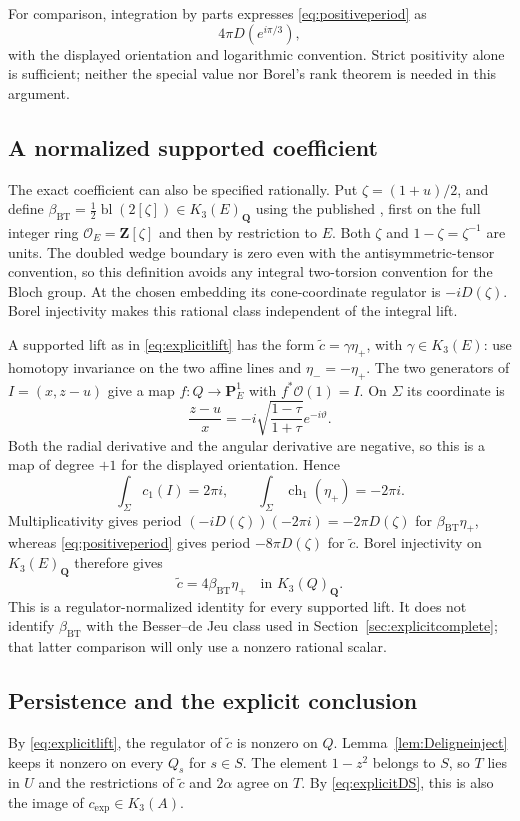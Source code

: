 \documentclass[11pt,a4paper]{article}
\theoremstyle{remark}
\newcommand{\Q}{\mathbf Q}
\newcommand{\Z}{\mathbf Z}
\newcommand{\OO}{\mathcal O}
\begin{document}
For comparison, integration by parts expresses \eqref{eq:positiveperiod} as
\[
4\pi D(e^{i\pi/3}),
\]
with the displayed orientation and logarithmic convention. Strict positivity alone is sufficient; neither the special value nor Borel's rank theorem is needed in this argument.

\subsection{A normalized supported coefficient}\label{sec:exactcoefficient}
The exact coefficient can also be specified rationally. Put $\zeta=(1+u)/2$, and define $\beta_{\mathrm{BT}}=\tfrac12\operatorname{bl}(2[\zeta])\in K_3(E)_{\Q}$ using the published \cite[Theorem~4.9 and (4.8)]{BunkeTamme}, first on the full integer ring $\OO_E=\Z[\zeta]$ and then by restriction to $E$. Both $\zeta$ and $1-\zeta=\zeta^{-1}$ are units. The doubled wedge boundary is zero even with the antisymmetric-tensor convention, so this definition avoids any integral two-torsion convention for the Bloch group. At the chosen embedding its cone-coordinate regulator is $-iD(\zeta)$. Borel injectivity makes this rational class independent of the integral lift.

A supported lift as in \eqref{eq:explicitlift} has the form $\widetilde c=\gamma\eta_+$, with $\gamma\in K_3(E)$: use homotopy invariance on the two affine lines and $\eta_-=-\eta_+$. The two generators of $I=(x,z-u)$ give a map $f:Q\to\mathbf P^1_E$ with $f^*\OO(1)=I$. On $\Sigma$ its coordinate is
\[
\frac{z-u}{x}=-i\sqrt{\frac{1-\tau}{1+\tau}}e^{-i\vartheta}.
\]
Both the radial derivative and the angular derivative are negative, so this is a map of degree $+1$ for the displayed orientation. Hence
\[
\int_\Sigma c_1(I)=2\pi i,\qquad
\int_\Sigma\operatorname{ch}_1(\eta_+)=-2\pi i.
\]
Multiplicativity gives period $(-iD(\zeta))(-2\pi i)=-2\pi D(\zeta)$ for $\beta_{\mathrm{BT}}\eta_+$, whereas \eqref{eq:positiveperiod} gives period $-8\pi D(\zeta)$ for $\widetilde c$. Borel injectivity on $K_3(E)_{\Q}$ therefore gives
\begin{equation}\label{eq:exactcoefficient}
\widetilde c=4\beta_{\mathrm{BT}}\eta_+
\quad\text{in }K_3(Q)_{\Q}.
\end{equation}
This is a regulator-normalized identity for every supported lift. It does not identify $\beta_{\mathrm{BT}}$ with the Besser--de Jeu class used in Section~\ref{sec:explicitcomplete}; that latter comparison will only use a nonzero rational scalar.

\subsection{Persistence and the explicit conclusion}
By \eqref{eq:explicitlift}, the regulator of $\widetilde c$ is nonzero on $Q$. Lemma~\ref{lem:Deligneinject} keeps it nonzero on every $Q_s$ for $s\in S$. The element $1-z^2$ belongs to $S$, so $T$ lies in $U$ and the restrictions of $\widetilde c$ and $2\alpha$ agree on $T$. By \eqref{eq:explicitDS}, this is also the image of $c_{\mathrm{exp}}\in K_3(A)$.
\end{document}
